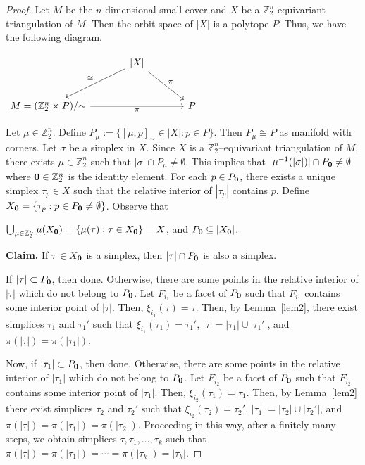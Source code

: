 \documentclass[11pt]{amsart}
\numberwithin{equation}{section}
\theoremstyle{definition}
\def \bb{\mathbb}
\def \ZZ{{\bb{Z}}}
\begin{document}
\begin{proof}
Let $M$ be the $n$-dimensional small cover and $X$ be a $\ZZ_2^n$-equivariant triangulation of $M$. Then the orbit space of $|X|$ is a polytope $P$. Thus, we have the following diagram.
\begin{center}
  
$
\begin{tikzcd}[row sep=large, column sep=large]
  & {|X|}\arrow[dr, "\pi"] \arrow[dl, "\cong"'] & \\
  M=(\mathbb{Z}_2^n \times P)/{\sim} \arrow[rr, "\pi"'] & & P
\end{tikzcd}
$
\end{center}
Let $\mu \in \ZZ_2^n$. Define
$P_{\mu} := \{[\mu, p]_{\sim} \in |X| : p \in P\}$.
Then $P_{\mu} \cong P$ as manifold with corners. Let $\sigma$ be a simplex in $X$. Since $X$ is a $\ZZ_2^n$–equivariant triangulation of $M$, there exists $\mu \in \ZZ_2^n$ such that $|\sigma| \cap P_{\mu} \neq \emptyset$. This implies that
$|\mu^{-1}(|\sigma|)| \cap P_{\bf 0} \neq \emptyset$ where ${\bf 0}\in \ZZ_2^n$ is the identity element. For each $p \in P_{\bf 0}$, there exists a unique simplex $\tau_p \in X$ such that the relative interior of $|\tau_p|$ contains $p$. Define 
$X_{\bf 0} = \{\tau_p : p \in P_{\bf 0} \neq \emptyset\}$.
Observe that



$\bigcup_{\mu \in \ZZ_2^n} \mu(X_{\bf 0}) = \{\mu(\tau) : \tau \in X_{\bf 0}\} = X$, and $P_{\bf 0} \subseteq |X_{\bf 0}|$. 

\noindent\textbf{Claim.} If $\tau \in X_{\bf 0}$ is a simplex, then $|\tau| \cap P_{\bf 0}$ is also a simplex.

If $|\tau| \subset P_{\bf 0}$, then done. Otherwise, there are some points in the relative interior of $|\tau|$ which do not belong to $P_{\bf 0}$. Let $F_{i_1}$ be a facet of $P_{\bf 0}$ such that $F_{i_1}$ contains some interior point of $|\tau|$. Then, $\xi_{i_1}(\tau)=\tau$. 
Then, by Lemma~\ref{lem2}, there exist simplices $\tau_1$ and $\tau_1'$ such that $\xi_{i_1}(\tau_1) = \tau_1'$, $|\tau| = |\tau_1| \cup |\tau_1'|$, and $\pi(|\tau|) = \pi(|\tau_1|)$.

Now, if  $|\tau_1| \subset P_{\bf 0}$, then done. Otherwise, there are some points in the relative interior of $|\tau_1|$ which do not belong to $P_{\bf 0}$. Let $F_{i_2}$ be a facet of $P_{\bf 0}$ such that $F_{i_2}$ contains some interior point of $|\tau_1|$.
Then, $\xi_{i_2}(\tau_1)=\tau_1$. Then, by Lemma~\ref{lem2} there exist simplices $\tau_2$ and $\tau_2'$ such that $\xi_{i_2}(\tau_2) = \tau_2'$, $|\tau_1| = |\tau_2| \cup |\tau_2'|$, and $\pi(|\tau|) = \pi(|\tau_1|)=\pi(|\tau_2|)$.
Proceeding in this way, after a finitely many steps, we obtain simplices $\tau, \tau_1, \ldots, \tau_k$ such that
$\pi(|\tau|) = \pi(|\tau_1|) = \cdots = \pi(|\tau_k|) = |\tau_k|$.


\end{proof}
\end{document}
